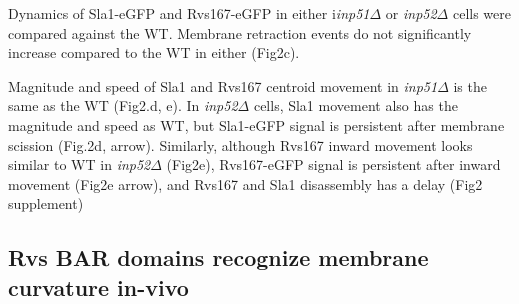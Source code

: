 \documentclass[9pt,lineno]{elife}
\begin{document}
Dynamics of Sla1-eGFP and Rvs167-eGFP in either i\textit{inp51$\Delta$} or \textit{inp52$\Delta$} cells were compared against the WT. Membrane retraction events do not significantly increase compared to the WT in either (Fig2c). 

Magnitude and speed of Sla1 and Rvs167 centroid movement in \textit{inp51$\Delta$} is the same as the WT (Fig2.d, e). In \textit{inp52$\Delta$} cells, Sla1 movement also has the magnitude and speed as WT, but Sla1-eGFP signal is persistent after membrane scission (Fig.2d, arrow). Similarly, although Rvs167 inward movement looks similar to WT in \textit{inp52$\Delta$} (Fig2e), Rvs167-eGFP signal is persistent after inward movement (Fig2e arrow), and Rvs167 and Sla1 disassembly has a delay (Fig2 supplement) 






\subsection{Rvs BAR domains recognize membrane curvature in-vivo}
\end{document}
